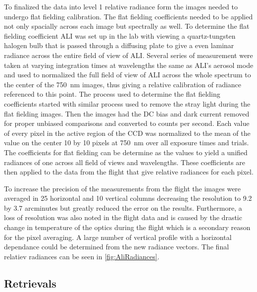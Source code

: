 \documentclass[12pt]{article}
\begin{document}
To finalized the data into level 1 relative radiance form the images needed to undergo flat fielding calibration. The flat fielding coefficients needed to be applied not only spacially across each image but spectrally as well. To determine the flat fielding coefficient ALI was set up in the lab with viewing a quartz-tungsten halogen bulb that is passed through a diffusing plate to give a even laminar radiance across the entire field of view of ALI. Several series of measurement were taken at varying integration times at wavelengths the same as ALI's aerosol mode and used to normalized the full field of view of ALI across the whole spectrum to the center of the 750~nm images, thus giving a relative calibration of radiance referenced to this point. The process used to determine the flat fielding coefficients started with similar process used to remove the stray light during the flat fielding images. Then the images had the DC bias and dark current removed for proper unbiased comparisons and converted to counts per second. Each value of every pixel in the active region of the CCD was normalized to the mean of the value on the center 10 by 10 pixels at 750~nm over all exposure times and trials. The coefficients for flat fielding can be determine as the values to yield a unified radiances of one across all field of views and wavelengths. These coefficients are then applied to the data from the flight that give relative radiances for each pixel.

To increase the precision of the measurements from the flight the images were averaged in 25 horizontal and 10 vertical columns decreasing the resolution to 9.2 by 3.7 arcminutes but greatly reduced the error on the results. Furthermore, a loss of resolution was also noted in the flight data and is caused by the drastic change in temperature of the optics during the flight which is a secondary reason for the pixel averaging. A large number of vertical profile with a horizontal dependance could be determined from the new radiance vectors. The final relatiev radiances can be seen in \autoref{fig:AliRadiances}.

\subsection{Retrievals}
\end{document}
